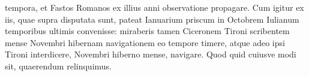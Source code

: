 tempora, et Fastos Romanos ex illius anni observatione propagare.
Cum igitur ex iis, quae supra disputata sunt, pateat Ianuarium priscum
in Octobrem Iulianum temporibus ultimis convenisse: miraberis
tamen Ciceronem Tironi scribentem mense Novembri hibernam
navigationem eo tempore timere, atque adeo ipsi Tironi interdicere,
Novembri hiberno mense, navigare.
Quod quid cuiusve modi sit,
quaerendum relinquimus.




































